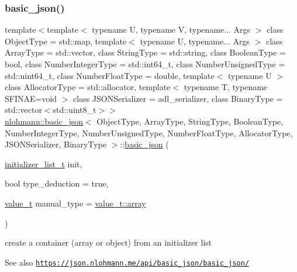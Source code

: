 \subsubsection{\texorpdfstring{basic\+\_\+json()}{basic\_json()}\hspace{0.1cm}{\footnotesize\ttfamily [5/9]}}
{\footnotesize\ttfamily template$<$template$<$ typename U, typename V, typename... Args $>$ class Object\+Type = std\+::map, template$<$ typename U, typename... Args $>$ class Array\+Type = std\+::vector, class String\+Type  = std\+::string, class Boolean\+Type  = bool, class Number\+Integer\+Type  = std\+::int64\+\_\+t, class Number\+Unsigned\+Type  = std\+::uint64\+\_\+t, class Number\+Float\+Type  = double, template$<$ typename U $>$ class Allocator\+Type = std\+::allocator, template$<$ typename T, typename S\+F\+I\+N\+A\+E=void $>$ class J\+S\+O\+N\+Serializer = adl\+\_\+serializer, class Binary\+Type  = std\+::vector$<$std\+::uint8\+\_\+t$>$$>$ \\
\hyperlink{classnlohmann_1_1basic__json}{nlohmann\+::basic\+\_\+json}$<$ Object\+Type, Array\+Type, String\+Type, Boolean\+Type, Number\+Integer\+Type, Number\+Unsigned\+Type, Number\+Float\+Type, Allocator\+Type, J\+S\+O\+N\+Serializer, Binary\+Type $>$\+::\hyperlink{classnlohmann_1_1basic__json}{basic\+\_\+json} (\begin{DoxyParamCaption}\item[{\hyperlink{classnlohmann_1_1basic__json_ac569f292a070dfd2f6b69c16e746095a}{initializer\+\_\+list\+\_\+t}}]{init,  }\item[{bool}]{type\+\_\+deduction = {\ttfamily true},  }\item[{\hyperlink{namespacenlohmann_1_1detail_a1ed8fc6239da25abcaf681d30ace4985}{value\+\_\+t}}]{manual\+\_\+type = {\ttfamily \hyperlink{namespacenlohmann_1_1detail_a1ed8fc6239da25abcaf681d30ace4985af1f713c9e000f5d3f280adbd124df4f5}{value\+\_\+t\+::array}} }\end{DoxyParamCaption})\hspace{0.3cm}{\ttfamily [inline]}}



create a container (array or object) from an initializer list 

\begin{DoxySeeAlso}{See also}
\href{https://json.nlohmann.me/api/basic_json/basic_json/}{\tt https\+://json.\+nlohmann.\+me/api/basic\+\_\+json/basic\+\_\+json/} 
\end{DoxySeeAlso}
\mbox{\label{classnlohmann_1_1basic__json_afbccea367512a87b5d76e2bd92c5cc85}} 
